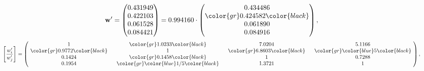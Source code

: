 \begin{example}
\begin{equation*}
\mathbf{w}^{\prime} =
\begin{pmatrix}
0.431949\\
0.422103\\
0.061528\\
0.084421
\end{pmatrix} =
0.994160\cdot
\begin{pmatrix}
0.434486\\
\color{gr} 0.424582\color{black} \\
0.061890\\
0.084916
\end{pmatrix},
\end{equation*}
\begin{equation*}
\left[ \frac{{w}^{\prime}_i}{{w}^{\prime}_j} \right] =
\begin{pmatrix}
$\,\,$ 1 $\,\,$ & $\,\,$\color{gr} 1.0233\color{black} $\,\,$ & $\,\,$7.0204$\,\,$ & $\,\,$5.1166$\,\,$ \\
$\,\,$\color{gr} 0.9772\color{black} $\,\,$ & $\,\,$ 1 $\,\,$ & $\,\,$\color{gr} 6.8603\color{black} $\,\,$ & $\,\,$\color{gr} \color{blue} 5\color{black}   $\,\,$ \\
$\,\,$0.1424$\,\,$ & $\,\,$\color{gr} 0.1458\color{black} $\,\,$ & $\,\,$ 1 $\,\,$ & $\,\,$0.7288 $\,\,$ \\
$\,\,$0.1954$\,\,$ & $\,\,$\color{gr} \color{blue}  1/5\color{black} $\,\,$ & $\,\,$1.3721$\,\,$ & $\,\,$ 1  $\,\,$ \\
\end{pmatrix},
\end{equation*}
\end{example}
\newpage
